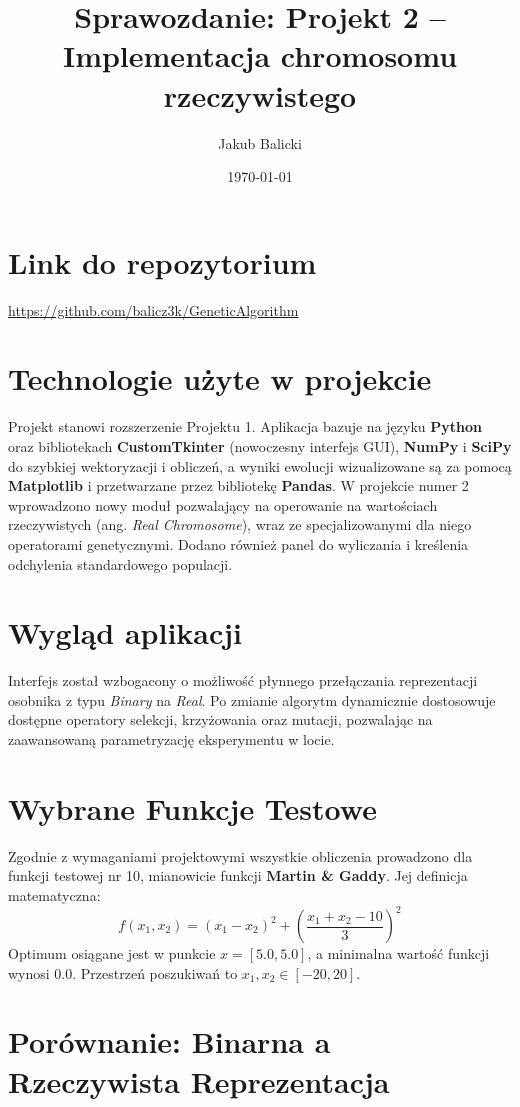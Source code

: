 \documentclass[12pt,a4paper]{article}
\title{Sprawozdanie: Projekt 2 -- Implementacja chromosomu rzeczywistego}
\author{Jakub Balicki}
\date{\today}
\begin{document}
\maketitle

\section*{Link do repozytorium}
\url{https://github.com/balicz3k/GeneticAlgorithm}

\section{Technologie użyte w projekcie}
Projekt stanowi rozszerzenie Projektu 1. Aplikacja bazuje na języku \textbf{Python} oraz bibliotekach \textbf{CustomTkinter} (nowoczesny interfejs GUI), \textbf{NumPy} i \textbf{SciPy} do szybkiej wektoryzacji i obliczeń, a wyniki ewolucji wizualizowane są za pomocą \textbf{Matplotlib} i przetwarzane przez bibliotekę \textbf{Pandas}. W projekcie numer 2 wprowadzono nowy moduł pozwalający na operowanie na wartościach rzeczywistych (ang. \textit{Real Chromosome}), wraz ze specjalizowanymi dla niego operatorami genetycznymi. Dodano również panel do wyliczania i kreślenia odchylenia standardowego populacji.

\section{Wygląd aplikacji}
Interfejs został wzbogacony o możliwość płynnego przełączania reprezentacji osobnika z typu \textit{Binary} na \textit{Real}. Po zmianie algorytm dynamicznie dostosowuje dostępne operatory selekcji, krzyżowania oraz mutacji, pozwalając na zaawansowaną parametryzację eksperymentu w locie.

\section{Wybrane Funkcje Testowe}
Zgodnie z wymaganiami projektowymi wszystkie obliczenia prowadzono dla funkcji testowej nr 10, mianowicie funkcji \textbf{Martin \& Gaddy}. Jej definicja matematyczna:
\[ f(x_1, x_2) = (x_1 - x_2)^2 + \left( \frac{x_1 + x_2 - 10}{3} \right)^2 \]
Optimum osiągane jest w punkcie $x = [5.0, 5.0]$, a minimalna wartość funkcji wynosi 0.0. Przestrzeń poszukiwań to $x_1, x_2 \in [-20, 20]$.

\section{Porównanie: Binarna a Rzeczywista Reprezentacja}
\end{document}
